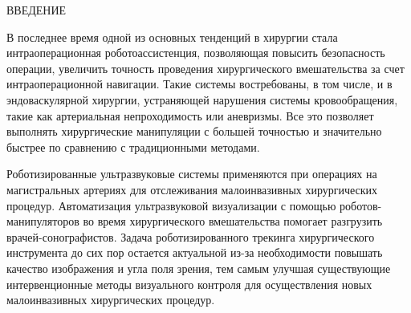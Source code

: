 \newpage
\begin{center}
ВВЕДЕНИЕ
\end{center}
\vspace{6mm}

В последнее время одной из основных тенденций в хирургии стала интраоперационная роботоассистенция, позволяющая повысить безопасность операции, увеличить точность проведения хирургического вмешательства за счет интраоперационной навигации. Такие системы востребованы, в том числе, и в эндоваскулярной хирургии, устраняющей нарушения системы кровообращения, такие как
артериальная непроходимость или аневризмы. Все это позволяет выполнять хирургические манипуляции с большей точностью и значительно быстрее по сравнению с традиционными методами.

Роботизированные ультразвуковые системы применяются при операциях на магистральных артериях для отслеживания малоинвазивных хирургических процедур. Автоматизация ультразвуковой визуализации с помощью роботов-манипуляторов во время хирургического вмешательства помогает разгрузить врачей-сонографистов. Задача роботизированного трекинга хирургического инструмента до сих пор остается актуальной из-за необходимости повышать качество изображения и угла поля зрения, тем самым улучшая существующие интервенционные методы визуального контроля для осуществления новых малоинвазивных хирургических процедур.


\newpage


